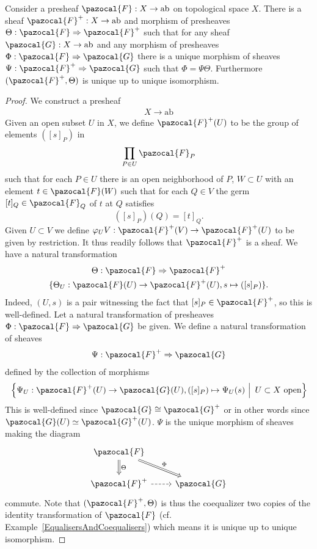 \begin{lemma}
    Consider a presheaf $\pazocal{F}:X\rightarrow \mathrm{ab}$ on topological space $X$. There is a sheaf $\pazocal{F}^{+}: X\rightarrow \mathrm{ab}$ and morphism of presheaves $\Theta : \pazocal{F}\Rightarrow\pazocal{F}^{+}$ such that for any sheaf $\pazocal{G}:X\rightarrow \mathrm{ab}$ and any morphism of presheaves $\Phi : \pazocal{F} \Rightarrow \pazocal{G}$ there is a unique morphism of sheaves $\Psi : \pazocal{F}^{+}\Rightarrow \pazocal{G}$ such that $\Phi = \Psi \Theta$. Furthermore $(\pazocal{F}^{+},\Theta)$ is unique up to unique isomorphism. 
\end{lemma}
\begin{proof}
    We construct a presheaf
    \begin{gather*}
        X\rightarrow \mathrm{ab}
    \end{gather*}
    Given an open subset $U$ in $X$, we define $\pazocal{F}^{+}(U)$ to be the group of elements $([s]_P)$ in 
    $$\prod_{P\in U} \pazocal{F}_P$$
    such that for each $P\in U$ there is an open neighborhood of $P$, $W\subset U$ with an element $t\in \pazocal{F}(W)$ such that for each $Q\in V$ the germ $[t]_Q\in \pazocal{F}_Q$ of $t$ at $Q$ satisfies
    $$([s]_P)(Q) = [t]_Q.$$
    Given $U\subset V$ we define $\varphi_UV : \pazocal{F}^{+}(V)\rightarrow \pazocal{F}^{+}(U)$ to be given by restriction. It thus readily follows that $\pazocal{F}^{+}$ is a sheaf. We have a natural transformation
    \begin{gather*}
        \Theta : \pazocal{F}\Rightarrow \pazocal{F}^{+}\\
        \{\Theta_U : \pazocal{F}(U)\rightarrow \pazocal{F}^{+}(U), s \mapsto ([s]_P)\}.
    \end{gather*}
    Indeed, $(U,s)$ is a pair witnessing the fact that $[s]_P\in \pazocal{F}^{+}$, so this is well-defined. Let a natural transformation of presheaves $\Phi : \pazocal{F}\Rightarrow \pazocal{G}$ be given. We define a natural transformation of sheaves 
    \begin{gather*}
        \Psi: \pazocal{F}^{+} \Rightarrow \pazocal{G}
    \end{gather*}
    defined by the collection of morphisms  
    $$
        \left.\left\{ \Psi_U: \pazocal{F}^{+}(U) \rightarrow \pazocal{G}(U), ([s]_P)\mapsto \Psi_U(s) \ \right| \   U\subset X \text{ open}\right\}
    $$
    This is well-defined since $\pazocal{G} \cong \pazocal{G}^{+}$ or in other words since $\pazocal{G}(U)\simeq \pazocal{G}^{+}(U)$. $\Psi$ is the unique morphism of sheaves making the diagram
    $$
        \begin{tikzcd}
            \pazocal{F} \arrow[rd,Rightarrow, "\Phi"] \arrow[d,"\Theta",Rightarrow]\\
            \pazocal{F}^{+} \arrow[r, dashrightarrow] & \pazocal{G}
        \end{tikzcd}
    $$
    commute. Note that $(\pazocal{F}^{+},\Theta)$ is thus the coequalizer two copies of the identity transformation of $\pazocal{F}$ (cf. Example~\ref{EqualisersAndCoequalisers}) which means it is unique up to unique isomorphism.
\end{proof}
